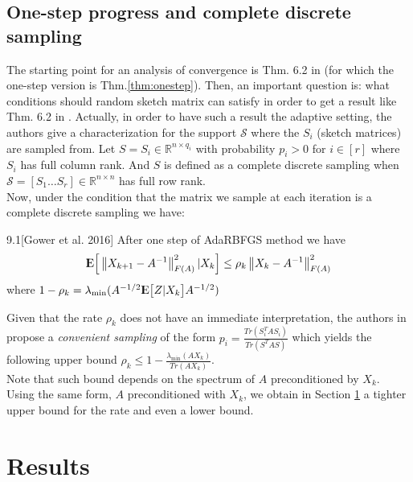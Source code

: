 \documentclass[12pt,conference,compsocconf]{IEEEtran}
\newcommand\norm[1]{\left\lVert#1\right\rVert}
\newcommand{\E}{{\rm I\kern-.3em E}}
\newcommand{\R}{\mathbb{R}}
\begin{document}
\subsection{One-step progress and complete discrete sampling}\label{sect:completediscrete}
The starting point for an analysis of convergence is Thm. 6.2 in \cite{Gower1} (for which the one-step version is Thm.\ref{thm:onestep}). Then, an important question is: what conditions should random sketch matrix can satisfy in order to get a result like Thm. 6.2 in \cite{Gower1}. Actually, in order to have such a result the adaptive setting, the authors give a characterization for the support $\mathcal{S}$ where the $S_i$ (sketch matrices) are sampled from. Let $S=S_i\in \R^{n\times q_i}$ with probability $p_i>0$ for $i \in [r]$ where $S_i$ has full column rank. And $S$ is defined as a complete discrete sampling when $\mathcal{S}=[S_1\ldots S_r]\in \R^{n\times n}$ has full row rank.\\
Now, under the condition that the matrix we sample at each iteration is a complete discrete sampling we have:
\begin{customthm}{9.1}[Gower et al. 2016]\label{thm:onestep}
After one step of AdaRBFGS method we have\\

\begin{align}\label{eq:onestepprogress}
	\E\Big[\norm{X_{k+1}-A^{-1}}^2_{F(A)}|X_k\Big] \leq \rho _k\norm{X_k-A^{-1}}^2_{F(A)}
\end{align}
where $1-\rho_k=\lambda_{\text{min}}(A^{-1/2}\E\big[Z|X_k\big]A^{-1/2})$
\end{customthm}

Given that the rate $\rho_k$ does not have an immediate interpretation, the authors in \cite{Gower1} propose a \textit{convenient sampling} of the form $p_i=\frac{Tr(S_i^TAS_i)}{Tr(S^TAS)}$ which yields the following upper bound $\rho_k \leq 1-\frac{\lambda_{\text{min}}(AX_k)}{Tr(AX_k)}$.\\
Note that such bound depends on the spectrum of $A$ preconditioned by $X_k$. Using the same form, $A$ preconditioned with $X_k$, we obtain in Section \ref{sect:results} a tighter upper bound for the rate and even a lower bound.


\section{Results}\label{sect:results}
\end{document}
